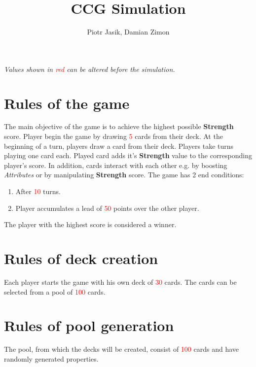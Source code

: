 \documentclass{article}
\title{CCG Simulation}
\author{Piotr Jasik, Damian Zimon}
\begin{document}
\maketitle

\begin{center}
    \textit{Values shown in \textcolor{red}{red} can be altered before the simulation.}
\end{center}

\section{Rules of the game}

    The main objective of the game is to achieve the highest possible \textbf{Strength} score. 
    Player begin the game by drawing \textcolor{red}{5} cards from their deck.
    At the beginning of a turn, players draw a card from their deck.
    Players take turns playing one card each.
    Played card adds it's \textbf{Strength} value to the corresponding player's score. 
    In addition, cards interact with each other e.g. by boosting \textit{Attributes} or by manipulating \textbf{Strength} score. 
    The game has 2 end conditions: 
    
    \begin{enumerate}
        \item After \textcolor{red}{10} turns.
        \item Player accumulates a lead of \textcolor{red}{50} points over the other player.
    \end{enumerate}
    
    \begin{flushleft}
        The player with the highest score is considered a winner.
    \end{flushleft}

\section{Rules of deck creation}
    
    Each player starts the game with his own deck of \textcolor{red}{30} cards. 
    The cards can be selected from a pool of \textcolor{red}{100} cards.

\section{Rules of pool generation}
    
    The pool, from which the decks will be created, consist of \textcolor{red}{100} cards and have randomly generated properties.
\end{document}
